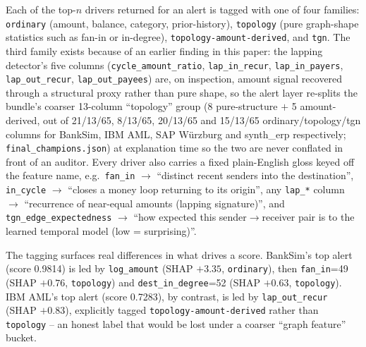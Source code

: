 Each of the top-$n$ drivers returned for an alert is tagged with one of four
families: \texttt{ordinary} (amount, balance, category, prior-history),
\texttt{topology} (pure graph-shape statistics such as fan-in or
in-degree), \texttt{topology-amount-derived}, and \texttt{tgn}. The third
family exists because of an earlier finding in this paper: the lapping
detector's five columns (\texttt{cycle\_amount\_ratio},
\texttt{lap\_in\_recur}, \texttt{lap\_in\_payers}, \texttt{lap\_out\_recur},
\texttt{lap\_out\_payees}) are, on inspection, amount signal recovered
through a structural proxy rather than pure shape, so the alert layer
re-splits the bundle's coarser 13-column ``topology'' group (8 pure-structure
$+$ 5 amount-derived, out of 21/13/65, 8/13/65, 20/13/65 and 15/13/65
ordinary/topology/tgn columns for BankSim, IBM AML, SAP Würzburg and
synth\_erp respectively; \texttt{final\_champions.json}) at explanation time
so the two are never conflated in front of an auditor. Every driver also
carries a fixed plain-English gloss keyed off the feature name, e.g.\
\texttt{fan\_in} $\to$ ``distinct recent senders into the destination'',
\texttt{in\_cycle} $\to$ ``closes a money loop returning to its origin'', any
\texttt{lap\_*} column $\to$ ``recurrence of near-equal amounts (lapping
signature)'', and \texttt{tgn\_edge\_expectedness} $\to$ ``how expected this
sender$\to$receiver pair is to the learned temporal model (low = surprising)''.

The tagging surfaces real differences in what drives a score. BankSim's top
alert (score 0.9814) is led by \texttt{log\_amount} (SHAP $+3.35$,
\texttt{ordinary}), then \texttt{fan\_in}=49 (SHAP $+0.76$,
\texttt{topology}) and \texttt{dest\_in\_degree}=52 (SHAP $+0.63$,
\texttt{topology}). IBM AML's top alert (score 0.7283), by contrast, is led
by \texttt{lap\_out\_recur} (SHAP $+0.83$), explicitly tagged
\texttt{topology-amount-derived} rather than \texttt{topology} -- an honest
label that would be lost under a coarser ``graph feature'' bucket.

